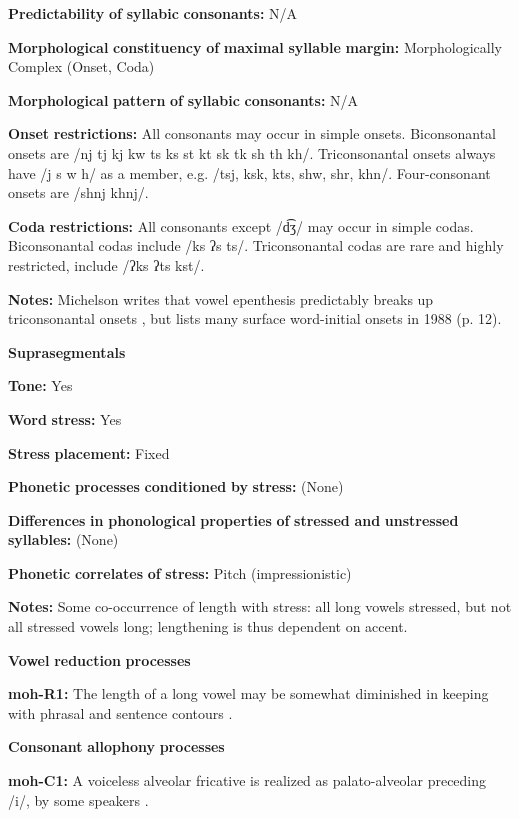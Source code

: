 \begin{styleBody}
\textbf{Predictability} \textbf{of} \textbf{syllabic} \textbf{consonants:} N/A

\textbf{Morphological} \textbf{constituency} \textbf{of} \textbf{maximal} \textbf{syllable} \textbf{margin:} Morphologically Complex (Onset, Coda)

\textbf{Morphological} \textbf{pattern} \textbf{of} \textbf{syllabic} \textbf{consonants:} N/A

\textbf{Onset} \textbf{restrictions:} All consonants may occur in simple onsets. Biconsonantal onsets are /nj tj kj kw ts ks st kt sk tk sh th kh/. Triconsonantal onsets always have /j s w h/ as a member, e.g. /tsj, ksk, kts, shw, shr, khn/. Four-consonant onsets are /shnj khnj/.

\textbf{Coda} \textbf{restrictions:} All consonants except /d͡ʒ/ may occur in simple codas. Biconsonantal codas include /ks ʔs ts/. Triconsonantal codas are rare and highly restricted, include /ʔks ʔts kst/.

\textbf{Notes:} Michelson writes that vowel epenthesis predictably breaks up triconsonantal onsets , but lists many surface word-initial onsets in 1988 (p. 12).

\textbf{Suprasegmentals}

\textbf{Tone:} Yes

\textbf{Word} \textbf{stress:} Yes

\textbf{Stress} \textbf{placement:} Fixed

\textbf{Phonetic} \textbf{processes} \textbf{conditioned} \textbf{by} \textbf{stress:} (None)

\textbf{Differences} \textbf{in} \textbf{phonological} \textbf{properties} \textbf{of} \textbf{stressed} \textbf{and} \textbf{unstressed} \textbf{syllables:} (None)

\textbf{Phonetic} \textbf{correlates} \textbf{of} \textbf{stress:} Pitch (impressionistic)

\textbf{Notes:} Some co-occurrence of length with stress: all long vowels stressed, but not all stressed vowels long; lengthening is thus dependent on accent.

\textbf{Vowel} \textbf{reduction} \textbf{processes}

\textbf{moh-R1:} The length of a long vowel may be somewhat diminished in keeping with phrasal and sentence contours \citep[46]{Bonvillain1973}.

\textbf{Consonant} \textbf{allophony} \textbf{processes}

\textbf{moh-C1:} A voiceless alveolar fricative is realized as palato-alveolar preceding /i/, by some speakers \citep[31]{Bonvillain1973}.


\end{styleBody}
